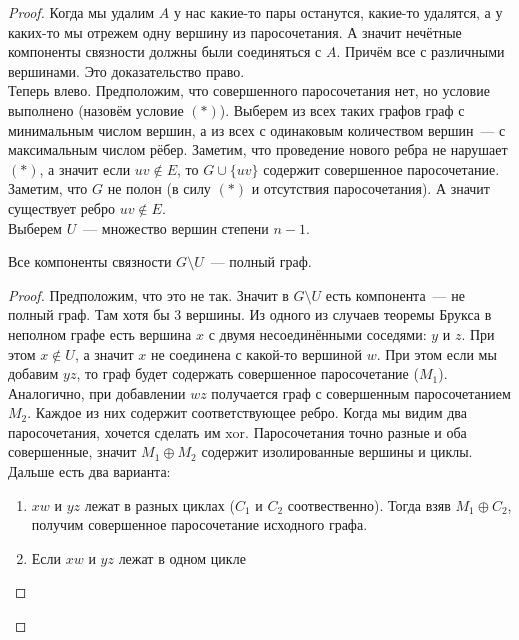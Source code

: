 \documentclass{article}
\begin{document}
    \begin{proof}
        Когда мы удалим $A$ у нас какие-то пары останутся, какие-то удалятся, а у каких-то мы отрежем одну вершину из паросочетания. А значит нечётные компоненты связности должны были соединяться с $A$. Причём все с различными вершинами. Это доказательство право.\\
        Теперь влево. Предположим, что совершенного паросочетания нет, но условие выполнено (назовём условие $(*)$). Выберем из всех таких графов граф с минимальным числом вершин, а из всех с одинаковым количеством вершин~--- с максимальным числом рёбер. Заметим, что проведение нового ребра не нарушает $(*)$, а значит если $uv\notin E$, то $G\cup\{uv\}$ содержит совершенное паросочетание. Заметим, что $G$ не полон (в силу $(*)$ и отсутствия паросочетания). А значит существует ребро $uv\notin E$.\\
        Выберем $U$~--- множество вершин степени $n-1$.
        \begin{lemma}
            Все компоненты связности $G\setminus U$~--- полный граф.
        \end{lemma}
        \begin{proof}
            Предположим, что это не так. Значит в $G\setminus U$ есть компонента~--- не полный граф. Там хотя бы 3 вершины. Из одного из случаев теоремы Брукса в неполном графе есть вершина $x$ с двумя несоединёнными соседями: $y$ и $z$. При этом $x\notin U$, а значит $x$ не соединена с какой-то вершиной $w$. При этом если мы добавим $yz$, то граф будет содержать совершенное паросочетание ($M_1$). Аналогично, при добавлении $wz$ получается граф с совершенным паросочетанием $M_2$. Каждое из них содержит соответствующее ребро. Когда мы видим два паросочетания, хочется сделать им $\mathrm{xor}$. Паросочетания точно разные и оба совершенные, значит $M_1\oplus M_2$ содержит изолированные вершины и циклы. Дальше есть два варианта:
            \begin{enumerate}
                \item $xw$ и $yz$ лежат в разных циклах ($C_1$ и $C_2$ соотвественно). Тогда взяв $M_1\oplus C_2$, получим совершенное паросочетание исходного графа.
                \item Если $xw$ и $yz$ лежат в одном цикле
                \begin{figure}[H]
\end{figure}
\end{enumerate}
\end{proof}
\end{proof}
\end{document}
